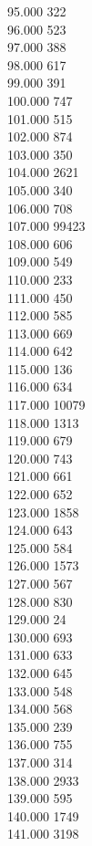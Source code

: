 { 95.000	322 \\
 96.000	523 \\
 97.000	388 \\
 98.000	617 \\
 99.000	391 \\
 100.000	747 \\
 101.000	515 \\
 102.000	874 \\
 103.000	350 \\
 104.000	2621 \\
 105.000	340 \\
 106.000	708 \\
 107.000	99423 \\
 108.000	606 \\
 109.000	549 \\
 110.000	233 \\
 111.000	450 \\
 112.000	585 \\
 113.000	669 \\
 114.000	642 \\
 115.000	136 \\
 116.000	634 \\
 117.000	10079 \\
 118.000	1313 \\
 119.000	679 \\
 120.000	743 \\
 121.000	661 \\
 122.000	652 \\
 123.000	1858 \\
 124.000	643 \\
 125.000	584 \\
 126.000	1573 \\
 127.000	567 \\
 128.000	830 \\
 129.000	24 \\
 130.000	693 \\
 131.000	633 \\
 132.000	645 \\
 133.000	548 \\
 134.000	568 \\
 135.000	239 \\
 136.000	755 \\
 137.000	314 \\
 138.000	2933 \\
 139.000	595 \\
 140.000	1749 \\
 141.000	3198 \\
}
